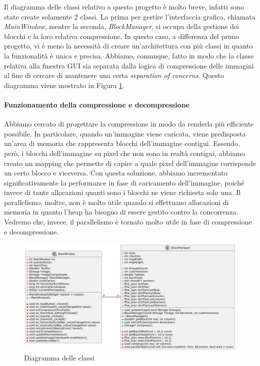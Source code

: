 Il diagramma delle classi relativo a questo progetto è molto breve, infatti sono state create solamente 2 classi. La prima per gestire l'interfaccia grafica, chiamata \textit{MainWindow}, mentre la seconda, \textit{BlockManager}, si occupa della gestione dei blocchi e la loro relativa compressione. In questo caso, a differenza del primo progetto, vi è meno la necessità di creare  un'architettura con più classi in quanto la funzionalità è unica e precisa. Abbiamo, comunque, fatto in modo che la classe relativa alla finestra GUI sia separata dalla logica di compressione delle immagini al fine di cercare di mantenere una certa \textit{separation of concerns}. Questo diagramma viene mostrato in Figura \ref{fig:class_diagram}.

\paragraph{Funzionamento della compressione e decompressione}
Abbiamo cercato di progettare la compressione in modo da renderla più efficiente possibile. In particolare, quando un'immagine viene caricata, viene predisposta un'area di memoria che rappresenta blocchi dell'immagine contigui. Essendo, però, i blocchi dell'immagine su pixel che non sono in realtà contigui, abbiamo creato un mapping che permette di capire a quale pixel dell'immagine corrisponde un certo blocco e viceversa. Con questa soluzione, abbiamo incrementato significativamente la performance in fase di caricamento dell'immagine, poiché invece di tante allocazioni quanti sono i blocchi ne viene richiesta solo una. Il parallelismo, inoltre, non è molto utile quando si effettuano allocazioni di memoria in quanto l'heap ha bisogno di essere gestito contro la concorrenza. Vedremo che, invece, il parallelismo è tornato molto utile in fase di compressione e decompressione.

\begin{figure}[h]
	\centering
	\includegraphics[width=1\linewidth]{figures/class diagram}
	\caption{Diagramma delle classi}
	\label{fig:class_diagram}
\end{figure}

